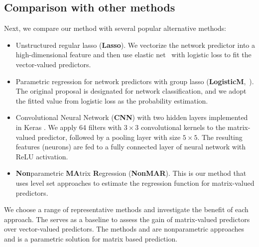 \documentclass[11pt]{article}
\theoremstyle{plain}
\theoremstyle{definition}
\def\CNN{\text{\bf \small CNN }}
\def\Lasso{\text{\bf \small Lasso }}
\def\NonparaM{\text{\bf \small NonMAR }}
\def\LogisticM{\text{\bf \small LogisticM }}
\begin{document}
\subsection{Comparison with other methods}\label{sec:comparison}
Next, we compare our method with several popular alternative methods:
\begin{itemize}[wide, labelwidth=!, labelindent=0pt]
\item Unstructured regular lasso ({\bf \small Lasso}). We vectorize the network predictor into a high-dimensional feature and then use elastic net~\citep{friedman2010regularization} with logistic loss to fit the vector-valued predictors.  
\item Parametric regression for network predictors with group lasso ({\bf \small LogisticM},~\cite{relion2019network}). The original proposal is designated for network classification, and we adopt the fitted value from logistic loss as the probability estimation. 
\item Convolutional Neural Network ({\bf \small CNN}) with two hidden layers implemented in Keras \citep{chollet2015keras}. We apply 64 filters with $3\times 3$ convolutional kernels to the matrix-valued predictor, followed by a pooling layer with size $5\times 5$. The resulting features (neurons) are fed to a fully connected layer of neural network with ReLU activation. 
\item {\bf \small Non}parametric {\bf \small MA}trix {\bf \small R}egression ({\bf \small NonMAR}). This is our method that uses level set approaches to estimate the regression function for matrix-valued predictors. 
\end{itemize}
We choose a range of representative methods and investigate the benefit of each approach. The \Lasso serves as a baseline to assess the gain of matrix-valued predictors over vector-valued predictors. The methods \CNN and \NonparaM are nonparametric approaches and \LogisticM is a parametric solution for matrix based prediction.  
\end{document}
